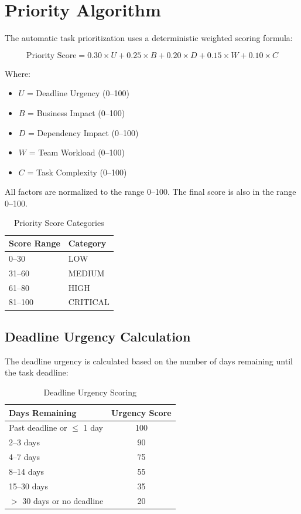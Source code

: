 \documentclass[12pt,a4paper,oneside]{report}
\begin{document}
\section{Priority Algorithm}

The automatic task prioritization uses a deterministic weighted scoring formula:

\begin{equation}
\text{Priority Score} = 0.30 \times U + 0.25 \times B + 0.20 \times D + 0.15 \times W + 0.10 \times C
\label{eq:priority}
\end{equation}

Where:
\begin{itemize}[noitemsep]
  \item $U$ = Deadline Urgency (0--100)
  \item $B$ = Business Impact (0--100)
  \item $D$ = Dependency Impact (0--100)
  \item $W$ = Team Workload (0--100)
  \item $C$ = Task Complexity (0--100)
\end{itemize}

All factors are normalized to the range 0--100. The final score is also in the range 0--100.

\begin{table}[H]
\centering
\caption{Priority Score Categories}
\label{tab:categories}
\begin{tabular}{|l|l|}
\hline
\textbf{Score Range} & \textbf{Category} \\
\hline
0--30     & LOW \\
31--60    & MEDIUM \\
61--80    & HIGH \\
81--100   & CRITICAL \\
\hline
\end{tabular}
\end{table}

\subsection{Deadline Urgency Calculation}

The deadline urgency is calculated based on the number of days remaining until the task deadline:

\begin{table}[H]
\centering
\caption{Deadline Urgency Scoring}
\label{tab:deadline}
\begin{tabular}{|l|c|}
\hline
\textbf{Days Remaining} & \textbf{Urgency Score} \\
\hline
Past deadline or $\leq$ 1 day  & 100 \\
2--3 days                      & 90  \\
4--7 days                      & 75  \\
8--14 days                     & 55  \\
15--30 days                    & 35  \\
$>$ 30 days or no deadline     & 20  \\
\hline
\end{tabular}
\end{table}
\end{document}
